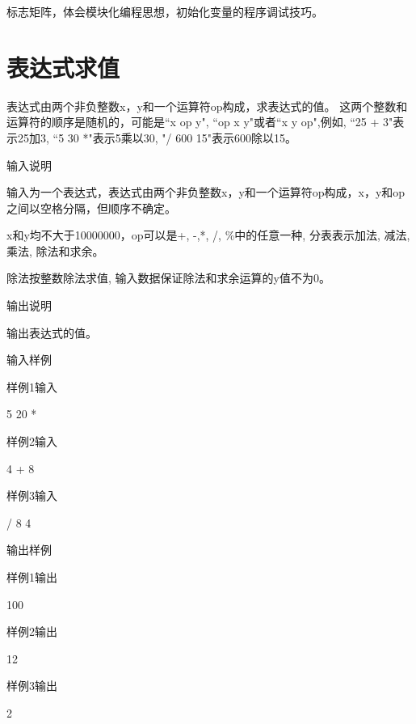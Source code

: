 \begin{note}[要点]
	标志矩阵，体会模块化编程思想，初始化变量的程序调试技巧。
\end{note}

\section{表达式求值}
表达式由两个非负整数x，y和一个运算符op构成，求表达式的值。
这两个整数和运算符的顺序是随机的，可能是``x op y", ``op x y"或者``x y op",例如, ``25 + 3"表示25加3, ``5 30 *"表示5乘以30, "/ 600 15"表示600除以15。

输入说明

输入为一个表达式，表达式由两个非负整数x，y和一个运算符op构成，x，y和op之间以空格分隔，但顺序不确定。

x和y均不大于10000000，op可以是+, -,*, /, \%中的任意一种, 分表表示加法, 减法, 乘法, 除法和求余。

除法按整数除法求值, 输入数据保证除法和求余运算的y值不为0。

输出说明	

输出表达式的值。

输入样例

样例1输入

5 20 *

样例2输入

4 + 8

样例3输入

/ 8 4

输出样例

样例1输出

100

样例2输出

12

样例3输出

2

